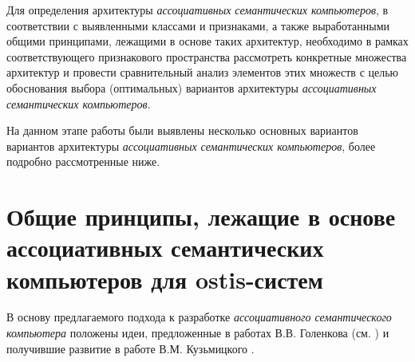 \begin{SCn}
\begin{scnsubdividing}
\begin{scnindent}
		\end{scnindent}
	\end{scnsubdividing}
	\begin{scnsubdividing}
		\begin{scnindent}
		\end{scnindent}
	\end{scnsubdividing}
\end{SCn}

Для определения архитектуры \textit{ассоциативных семантических компьютеров}, в соответствии с выявленными классами и признаками, а также выработанными общими принципами, лежащими в основе таких архитектур, необходимо в рамках соответствующего признакового пространства рассмотреть конкретные множества архитектур и провести сравнительный анализ элементов этих множеств с целью обоснования выбора (оптимальных) вариантов архитектуры \textit{ассоциативных семантических компьютеров}.

На данном этапе работы были выявлены несколько основных вариантов вариантов архитектуры \textit{ассоциативных семантических компьютеров}, более подробно рассмотренные ниже.

\section{Общие принципы, лежащие в основе ассоциативных семантических компьютеров для ostis-систем}
\label{sec_comp_common_principles}

В основу предлагаемого подхода к разработке \textit{ассоциативного семантического компьютера} положены идеи, предложенные в работах В.В. Голенкова (см. ) и получившие развитие в работе В.М. Кузьмицкого .


